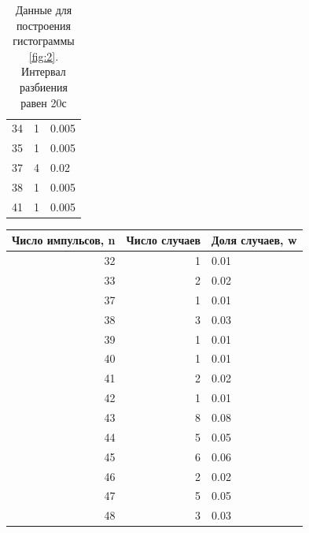 \documentclass[12pt]{article}
\begin{document}
\begin{table}[H]
\begin{center}
\begin{tabular}{|r|r|l|}
            34                 & 1             & 0.005           \\
            35                 & 1             & 0.005           \\
            37                 & 4             & 0.02            \\
            38                 & 1             & 0.005           \\
            41                 & 1             & 0.005           \\
            \hline
        \end{tabular}
    \end{center}
    \caption{Данные для построения гистограммы \ref{fig:2}. Интервал разбиения равен 20с}
    \label{tab:8}
\end{table}
\begin{table}[H]
    \begin{center}
        \begin{tabular}{|r|r|l|}
            \hline
            Число импульсов, n & Число случаев & Доля случаев, w \\
            \hline
            32                 & 1             & 0.01            \\
            33                 & 2             & 0.02            \\
            37                 & 1             & 0.01            \\
            38                 & 3             & 0.03            \\
            39                 & 1             & 0.01            \\
            40                 & 1             & 0.01            \\
            41                 & 2             & 0.02            \\
            42                 & 1             & 0.01            \\
            43                 & 8             & 0.08            \\
            44                 & 5             & 0.05            \\
            45                 & 6             & 0.06            \\
            46                 & 2             & 0.02            \\
            47                 & 5             & 0.05            \\
            48                 & 3             & 0.03            \\

\end{tabular}
\end{center}
\end{table}
\end{document}
